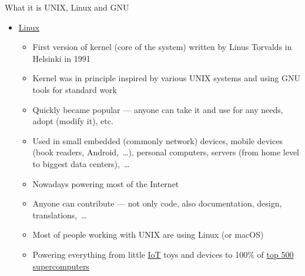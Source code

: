 \documentclass[compress, xelatex, 11pt, xcolor=svgnames, aspectratio=169,
	hyperref={
		bookmarks=true,
		unicode=true,
		colorlinks=true,
		pdftitle={Linux, command line and MetaCentrum},
		plainpages=false,
		pdfauthor={Vojtech Zeisek},
		pdfsubject={Course about use of Linux command line, writing shell scripts and using MetaCentrum of CESNET},
		pdfcreator={XeLaTeX},
		pdfkeywords={Linux, GNU, BASH, shell, command line, MetaCentrum},
		linkcolor=DarkRed, %
		anchorcolor=DarkBlue, %
		citecolor=Indigo, %
		filecolor=NavyBlue, %
		menucolor=DarkMagenta, %
		urlcolor=DarkBlue, %
		},
	url={hyphens, lowtilde} %
	]{beamer}
\begin{document}
\begin{frame}[allowframebreaks]{What it is UNIX, Linux and GNU}
\begin{itemize}
\begin{itemize}
			\item \enquote{GNU's Not Unix!} --- but it is compatible, respects its principles
			\item System written from scratch, following ideas of UNIX
			\item Since 1984 Richard Stallman (founder of \href{https://www.fsf.org/}{Free Software Foundation}) tried to make new kernel (Hurd --- not finished yet\ldots)
			\item Generally set of basic system tools --- working with many kernels (Linux, BSD*, macOS,~\ldots), also present in many commercial paid UNIX systems
			\item Source code is free and open --- anyone can study it (Security!), report bugs, contribute, modify, share it, get inspiration,~\ldots
			\item GNU General Public License (GPL) --- free spirit of open-source --- license, idea, how to share software to benefit everyone
			\item Inspired open public software development --- crucial for our usage of Linux \& al.
		\end{itemize}
		\item \href{https://en.wikipedia.org/wiki/Linux}{Linux}
		\begin{itemize}
			\item First version of kernel (core of the system) written by Linus Torvalds in Helsinki in 1991
			\item Kernel was in principle inspired by various UNIX systems and using GNU tools for standard work
			\item Quickly became popular --- anyone can take it and use for any needs, adopt (modify it), etc.
			\item Used in small embedded (commonly network) devices, mobile devices (book readers, Android,~\ldots), personal computers, servers (from home level to biggest data centers),~\ldots
			\item Nowadays powering most of the Internet
			\item Anyone can contribute --- not only code, also documentation, design, translations,~\ldots
			\item Most of people working with UNIX are using Linux (or macOS)
			\item Powering everything from little \href{https://en.wikipedia.org/wiki/Internet_of_things}{IoT} toys and devices to 100\% of \href{https://www.top500.org/statistics/list/}{top 500 supercomputers}
		\end{itemize}

\end{itemize}
\end{frame}
\end{document}
